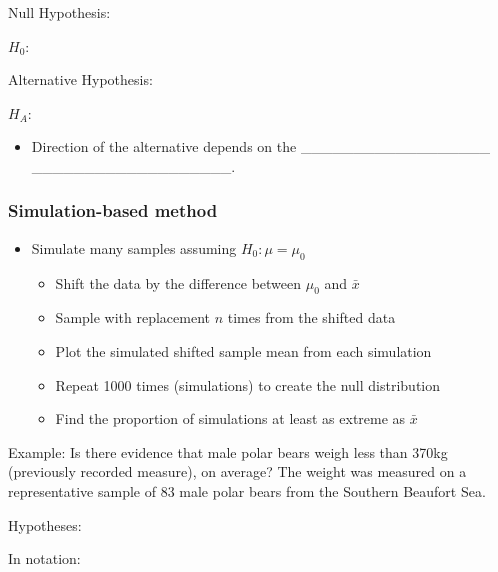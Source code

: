 \documentclass[
]{report}
\providecommand{\tightlist}{%
  \setlength{\itemsep}{0pt}\setlength{\parskip}{0pt}}
\begin{document}

Null Hypothesis:

\(H_0:\)

\vspace{0.2in}

Alternative Hypothesis:

\(H_A:\)

\vspace{0.2in}


\begin{itemize}
\tightlist
\item
  Direction of the alternative depends on the \_\_\_\_\_\_\_\_\_\_\_\_\_\_\_\_\_\_
  \_\_\_\_\_\_\_\_\_\_\_\_\_\_\_\_\_\_\_.
\end{itemize}


\subsubsection*{Simulation-based method}\label{simulation-based-method-2}

\begin{itemize}
\item
  Simulate many samples assuming \(H_0: \mu = \mu_0\)

  \begin{itemize}
  \item
    Shift the data by the difference between \(\mu_0\) and \(\bar{x}\)
  \item
    Sample with replacement \(n\) times from the shifted data
  \item
    Plot the simulated shifted sample mean from each simulation
  \item
    Repeat 1000 times (simulations) to create the null distribution
  \item
    Find the proportion of simulations at least as extreme as \(\bar{x}\)
  \end{itemize}
\end{itemize}

Example: Is there evidence that male polar bears weigh less than 370kg (previously recorded measure), on average? The weight was measured on a representative sample of 83 male polar bears from the Southern Beaufort Sea.

Hypotheses:

In notation:
\end{document}
